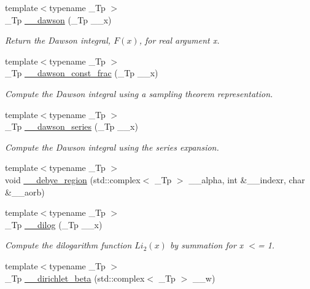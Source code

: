 \begin{DoxyCompactItemize}
{\footnotesize template$<$typename \+\_\+\+Tp $>$ }\\\+\_\+\+Tp \hyperlink{namespacestd_1_1____detail_a6384fb4c5af31b41a38c120869a548c7}{\+\_\+\+\_\+dawson} (\+\_\+\+Tp \+\_\+\+\_\+x)
\begin{DoxyCompactList}\small\item\em Return the Dawson integral, $ F(x) $, for real argument {\ttfamily x}. \end{DoxyCompactList}\item 
{\footnotesize template$<$typename \+\_\+\+Tp $>$ }\\\+\_\+\+Tp \hyperlink{namespacestd_1_1____detail_a3fe9fa143beb1a5d9f8ca18b3783f650}{\+\_\+\+\_\+dawson\+\_\+const\+\_\+frac} (\+\_\+\+Tp \+\_\+\+\_\+x)
\begin{DoxyCompactList}\small\item\em Compute the Dawson integral using a sampling theorem representation. \end{DoxyCompactList}\item 
{\footnotesize template$<$typename \+\_\+\+Tp $>$ }\\\+\_\+\+Tp \hyperlink{namespacestd_1_1____detail_a033d91cc1c67280385ff3d1d809a21d1}{\+\_\+\+\_\+dawson\+\_\+series} (\+\_\+\+Tp \+\_\+\+\_\+x)
\begin{DoxyCompactList}\small\item\em Compute the Dawson integral using the series expansion. \end{DoxyCompactList}\item 
{\footnotesize template$<$typename \+\_\+\+Tp $>$ }\\void \hyperlink{namespacestd_1_1____detail_a3212c0a136417e862f2ed8e9684e053c}{\+\_\+\+\_\+debye\+\_\+region} (std\+::complex$<$ \+\_\+\+Tp $>$ \+\_\+\+\_\+alpha, int \&\+\_\+\+\_\+indexr, char \&\+\_\+\+\_\+aorb)
\item 
{\footnotesize template$<$typename \+\_\+\+Tp $>$ }\\\+\_\+\+Tp \hyperlink{namespacestd_1_1____detail_a5083a0c9fce3299593ca22e7dbaeaf19}{\+\_\+\+\_\+dilog} (\+\_\+\+Tp \+\_\+\+\_\+x)
\begin{DoxyCompactList}\small\item\em Compute the dilogarithm function $ Li_2(x) $ by summation for x $<$= 1. \end{DoxyCompactList}\item 
{\footnotesize template$<$typename \+\_\+\+Tp $>$ }\\\+\_\+\+Tp \hyperlink{namespacestd_1_1____detail_ae2e1407cd73ed7ca37c9085971d64787}{\+\_\+\+\_\+dirichlet\+\_\+beta} (std\+::complex$<$ \+\_\+\+Tp $>$ \+\_\+\+\_\+w)

\end{DoxyCompactItemize}

